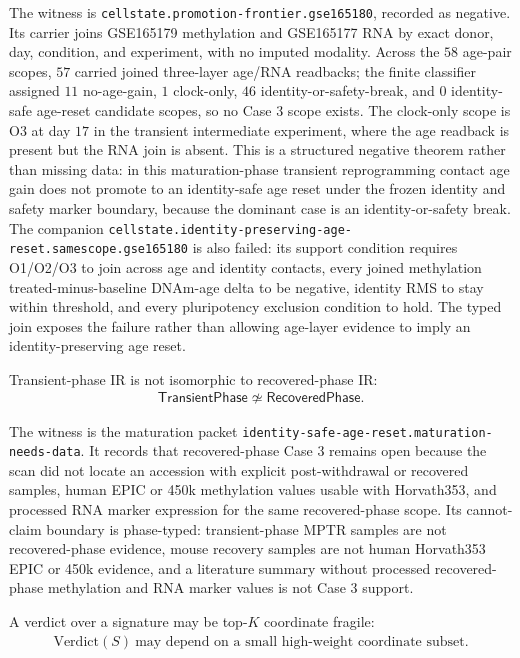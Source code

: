 The witness is \texttt{cellstate.promotion-frontier.gse165180}, recorded as negative. Its carrier joins GSE165179 methylation and GSE165177 RNA by exact donor, day, condition, and experiment, with no imputed modality. Across the $58$ age-pair scopes, $57$ carried joined three-layer age/RNA readbacks; the finite classifier assigned $11$ no-age-gain, $1$ clock-only, $46$ identity-or-safety-break, and $0$ identity-safe age-reset candidate scopes, so no Case $3$ scope exists. The clock-only scope is O3 at day $17$ in the transient intermediate experiment, where the age readback is present but the RNA join is absent. This is a structured negative theorem rather than missing data: in this maturation-phase transient reprogramming contact age gain does not promote to an identity-safe age reset under the frozen identity and safety marker boundary, because the dominant case is an identity-or-safety break. The companion \texttt{cellstate.identity-preserving-age-reset.samescope.gse165180} is also failed: its support condition requires O1/O2/O3 to join across age and identity contacts, every joined methylation treated-minus-baseline DNAm-age delta to be negative, identity RMS to stay within threshold, and every pluripotency exclusion condition to hold. The typed join exposes the failure rather than allowing age-layer evidence to imply an identity-preserving age reset.

\begin{proposition}
\label{prop:phase-type-separation}
Transient-phase IR is not isomorphic to recovered-phase IR:
$$
\begin{aligned}
\mathsf{TransientPhase}\not\simeq\mathsf{RecoveredPhase}.
\end{aligned}
$$
\end{proposition}

The witness is the maturation packet \texttt{identity-safe-age-reset.maturation-needs-data}. It records that recovered-phase Case $3$ remains open because the scan did not locate an accession with explicit post-withdrawal or recovered samples, human EPIC or 450k methylation values usable with Horvath353, and processed RNA marker expression for the same recovered-phase scope. Its cannot-claim boundary is phase-typed: transient-phase MPTR samples are not recovered-phase evidence, mouse recovery samples are not human Horvath353 EPIC or 450k evidence, and a literature summary without processed recovered-phase methylation and RNA marker values is not Case $3$ support.

\begin{proposition}
\label{prop:coordinate-fragility}
A verdict over a signature may be top-$K$ coordinate fragile:
$$
\begin{aligned}
\mathrm{Verdict}(S)\ \text{may depend on a small high-weight coordinate subset.}
\end{aligned}
$$
\end{proposition}

